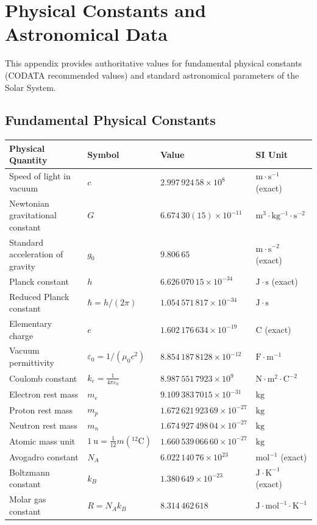\chapter{Physical Constants and Astronomical Data}
\label{app:constants}

This appendix provides authoritative values for fundamental physical constants (CODATA recommended values) and standard astronomical parameters of the Solar System.

\section{Fundamental Physical Constants}

\begin{center}
\renewcommand{\arraystretch}{1.3}
\begin{longtable}{@{}llll@{}}
\toprule
\textbf{Physical Quantity} & \textbf{Symbol} & \textbf{Value} & \textbf{SI Unit} \\
\midrule
\endhead
Speed of light in vacuum & $c$ & $2.997\,924\,58 \times 10^8$ & $\mathrm{m\cdot s^{-1}}$ (exact) \\
Newtonian gravitational constant & $G$ & $6.674\,30(15) \times 10^{-11}$ & $\mathrm{m^3\cdot kg^{-1}\cdot s^{-2}}$ \\
Standard acceleration of gravity & $g_0$ & $9.806\,65$ & $\mathrm{m\cdot s^{-2}}$ (exact) \\
Planck constant & $h$ & $6.626\,070\,15 \times 10^{-34}$ & $\mathrm{J\cdot s}$ (exact) \\
Reduced Planck constant & $\hbar = h/(2\pi)$ & $1.054\,571\,817 \times 10^{-34}$ & $\mathrm{J\cdot s}$ \\
Elementary charge & $e$ & $1.602\,176\,634 \times 10^{-19}$ & $\mathrm{C}$ (exact) \\
Vacuum permittivity & $\varepsilon_0 = 1/(\mu_0 c^2)$ & $8.854\,187\,8128 \times 10^{-12}$ & $\mathrm{F\cdot m^{-1}}$ \\
Coulomb constant & $k_e = \frac{1}{4\pi\varepsilon_0}$ & $8.987\,551\,7923 \times 10^9$ & $\mathrm{N\cdot m^2\cdot C^{-2}}$ \\
Electron rest mass & $m_e$ & $9.109\,383\,7015 \times 10^{-31}$ & $\mathrm{kg}$ \\
Proton rest mass & $m_p$ & $1.672\,621\,923\,69 \times 10^{-27}$ & $\mathrm{kg}$ \\
Neutron rest mass & $m_n$ & $1.674\,927\,498\,04 \times 10^{-27}$ & $\mathrm{kg}$ \\
Atomic mass unit & $1\ \mathrm{u} = \frac{1}{12}m(^{12}\mathrm{C})$ & $1.660\,539\,066\,60 \times 10^{-27}$ & $\mathrm{kg}$ \\
Avogadro constant & $N_A$ & $6.022\,140\,76 \times 10^{23}$ & $\mathrm{mol^{-1}}$ (exact) \\
Boltzmann constant & $k_B$ & $1.380\,649 \times 10^{-23}$ & $\mathrm{J\cdot K^{-1}}$ (exact) \\
Molar gas constant & $R = N_A k_B$ & $8.314\,462\,618$ & $\mathrm{J\cdot mol^{-1}\cdot K^{-1}}$ \\
\bottomrule
\end{longtable}
\end{center}

